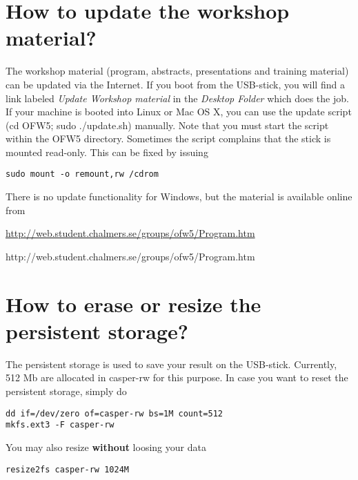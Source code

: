 \documentclass[11pt,a4paper,twocolumn]{article}
\begin{document}
\section{How to update the workshop material?}

The workshop material (program, abstracts, presentations and training material)
can be updated via the Internet. If you boot from the USB-stick, you will find a
link labeled \emph{Update Workshop material} in the \emph{Desktop Folder} which
does the job. If your machine is booted into Linux or Mac OS X, you can use the
update script (cd OFW5; sudo ./update.sh) manually. Note that you must start the
script within the OFW5 directory. Sometimes the script complains that the stick
is mounted read-only. This can be fixed by issuing
{\small
\begin{verbatim}
sudo mount -o remount,rw /cdrom
\end{verbatim}}

There is no update functionality for Windows, but the material is available
online from
\begin{latexonly}
\href{http://web.student.chalmers.se/groups/ofw5/Program.htm}{http://web.student.chalmers.se/groups/ofw5/Program.htm}
\end{latexonly}
\begin{htmlonly}
 {http://web.student.chalmers.se/groups/ofw5/Program.htm}
\end{htmlonly}

\section{How to erase or resize the persistent storage?}

The persistent storage is used to save your result on the USB-stick. Currently,
512 Mb are allocated in casper-rw for this purpose. In case you want to reset
the persistent storage, simply do
{\small
\begin{verbatim}
dd if=/dev/zero of=casper-rw bs=1M count=512
mkfs.ext3 -F casper-rw
\end{verbatim}}

You may also resize {\bf without} loosing your data
{\small
\begin{verbatim}
resize2fs casper-rw 1024M
\end{verbatim}}
\end{document}
